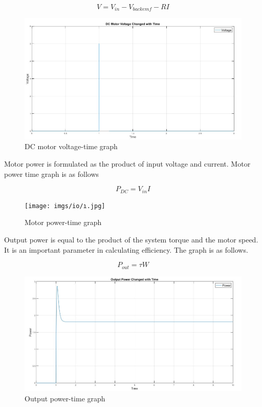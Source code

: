 \begin{equation}
V = V_{in} - V_{backemf} - RI 
\end{equation}

\begin{figure}[H]
    \centering
    \includegraphics[width=0.7\columnwidth]{imgs/io/h.jpg}
    \caption[DC motor voltage-time graph]{DC motor voltage-time graph}
    \label{fig-magnitude}
\end{figure}%

Motor power is formulated as the product of input voltage and current. Motor power time graph
is as follows

\begin{equation}
P_{DC} = V_{in} I    
\end{equation}

\begin{figure}[H]
    \centering
    \texttt{[image: imgs/io/ı.jpg]}
    \caption[Motor power-time graph]{Motor power-time graph}
    \label{fig-magnitude}
\end{figure}%

Output power is equal to the product of the system torque and the motor speed. It is an important
parameter in calculating efficiency. The graph is as follows.

\begin{equation}
P_{out} = \tau W
\end{equation}

\begin{figure}[H]
    \centering
    \includegraphics[width=0.7\columnwidth]{imgs/io/i.jpg}
    \caption[Output power-time graph]{Output power-time graph}
    \label{fig-magnitude}
\end{figure}%

